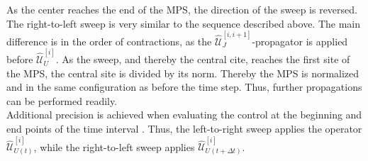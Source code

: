 As the center reaches the end of the MPS, the direction of the sweep is reversed. The right-to-left sweep is very similar to the sequence described above. The main difference is in the order of contractions, as the $\hat{\mathcal{U}}_{J}^{[i,i+1]}$-propagator is applied before $\hat{\mathcal{U}}_{U}^{[i]}$. As the sweep, and thereby the central cite, reaches the first site of the MPS, the central site is divided by its norm. Thereby the MPS is normalized and in the same configuration as before the time step. Thus, further propagations can be performed readily.\\ 
Additional precision is achieved when evaluating the control at the beginning and end points of the time interval \cite{Steck2007}. Thus, the left-to-right sweep applies the operator $\hat{\mathcal{U}}_{U(t)}^{[i]} $, while the right-to-left sweep applies $\hat{\mathcal{U}}_{U(t + \Delta t)}^{[i]}$.


